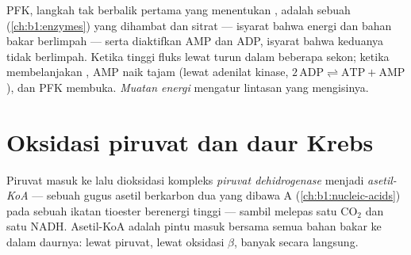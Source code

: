 \begin{proposition}\label{prop:b1:respiration-fermentation:pfk}
PFK, langkah tak berbalik pertama yang menentukan , adalah
sebuah  (\cref{ch:b1:enzymes}) yang dihambat  dan
sitrat --- isyarat bahwa energi dan bahan bakar  berlimpah
--- serta diaktifkan AMP dan ADP, isyarat bahwa keduanya tidak
berlimpah. Ketika  tinggi fluks lewat  turun dalam
beberapa sekon; ketika  membelanjakan , AMP naik tajam (lewat
adenilat kinase,
$2\,\mathrm{ADP} \rightleftharpoons \mathrm{ATP} + \mathrm{AMP}$), dan PFK
membuka. \emph{Muatan energi}  mengatur
lintasan yang mengisinya.
\end{proposition}

\section{Oksidasi piruvat dan daur Krebs}

\begin{definition}\label{def:b1:respiration-fermentation:pdh}
Piruvat masuk ke  lalu dioksidasi kompleks \emph{piruvat
dehidrogenase} menjadi \emph{asetil-KoA} --- sebuah
gugus asetil berkarbon dua yang dibawa  A
(\cref{ch:b1:nucleic-acids}) pada sebuah ikatan tioester berenergi
tinggi --- sambil melepas satu $\mathrm{CO_2}$ dan satu NADH.
Asetil-KoA adalah pintu masuk bersama semua bahan bakar ke dalam
daurnya:  lewat piruvat,  lewat oksidasi $\beta$,
banyak  secara langsung.
\end{definition}

